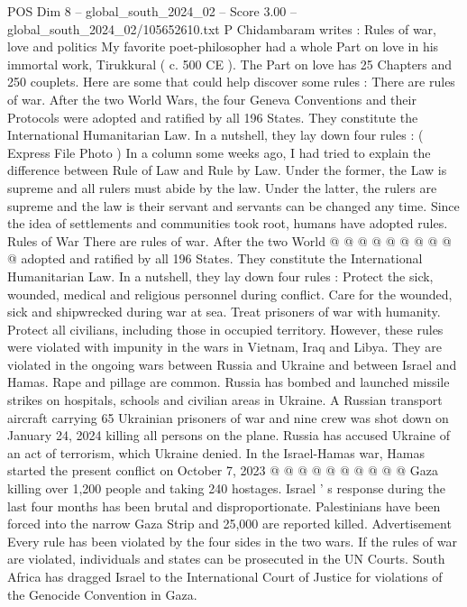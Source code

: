 \begin{textsample}{POS Dim 8 – global\_south\_2024\_02 – Score 3.00 – global\_south\_2024\_02/105652610.txt}  \label{ex:f8_pos_385}
P Chidambaram writes : Rules of war, love and politics My favorite poet-philosopher had a whole Part on love in his immortal work, Tirukkural ( c. 500 CE ).
The Part on love has 25 Chapters and 250 couplets.
Here are some that could help discover some rules : There are rules of war.
After the two World Wars, the four Geneva Conventions and their Protocols were adopted and ratified by all 196 States.
They constitute the International Humanitarian Law.
In a nutshell, they lay down four rules : ( Express File Photo ) In a column some weeks ago, I had tried to explain the difference between Rule of Law and Rule by Law.
Under the former, the Law is supreme and all rulers must abide by the law.
Under the latter, the rulers are supreme and the law is their servant and servants can be changed any time.
Since the idea of settlements and communities took root, humans have adopted rules.
Rules of War There are rules of war.
After the two World @ @ @ @ @ @ @ @ @ @ adopted and ratified by all 196 States.
They constitute the International Humanitarian Law.
In a nutshell, they lay down four rules : Protect the sick, wounded, medical and religious personnel during conflict.
Care for the wounded, sick and shipwrecked during war at sea.
Treat prisoners of war with humanity.
Protect all civilians, including those in occupied territory.
However, these rules were violated with impunity in the wars in Vietnam, Iraq and Libya.
They are violated in the ongoing wars between Russia and Ukraine and between Israel and Hamas.
Rape and pillage are common.
Russia has bombed and launched missile strikes on hospitals, schools and civilian areas in Ukraine.
A Russian transport aircraft carrying 65 Ukrainian prisoners of war and nine crew was shot down on January 24, 2024 killing all persons on the plane.
Russia has accused Ukraine of an act of terrorism, which Ukraine denied.
In the Israel-Hamas war, Hamas started the present conflict on October 7, 2023 @ @ @ @ @ @ @ @ @ @ Gaza killing over 1,200 people and taking 240 hostages.
Israel ' s response during the last four months has been brutal and disproportionate.
Palestinians have been forced into the narrow Gaza Strip and 25,000 are reported killed.
Advertisement Every rule has been violated by the four sides in the two wars.
If the rules of war are violated, individuals and states can be prosecuted in the UN Courts.
South Africa has dragged Israel to the International Court of Justice for violations of the Genocide Convention in Gaza.

\end{textsample}
